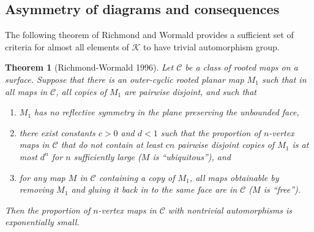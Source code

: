 \documentclass[amsmath,longbibliography,secnumarabic,floatfix,amssymb,nofootinbib,nobibnotes,letterpaper,11pt,notitlepage,tightenlines]{revtex4-1}
\newcommand{\FlatKnotDia}{\mathscr{K}}
\newtheorem{theorem}{Theorem}
\begin{document}
\subsection{Asymmetry of diagrams and consequences}
\label{sec:asymmetry}


The following theorem of Richmond and Wormald \cite{Richmond19951} provides a sufficient set of
criteria for almost all elements of $\FlatKnotDia$ to have trivial automorphism group.
\begin{theorem}[Richmond-Wormald 1996]
  Let $\mathscr C$ be a class of rooted maps on a surface. Suppose that there is an outer-cyclic
  rooted planar map $M_1$ such that in all maps in $\mathscr C$, all copies of $M_1$ are pairwise
  disjoint, and such that
  \begin{enumerate}
  \item $M_1$ has no reflective symmetry in the plane preserving the unbounded face,
  \item there exist constants $c > 0$ and $d < 1$ such that the proportion of $n$-vertex maps in
    $\mathscr C$ that do not contain at least $cn$ pairwise disjoint copies of $M_1$ is at most
    $d^n$ for $n$ sufficiently large ($M$ is ``ubiquitous''), and
  \item for any map $M$ in $\mathscr C$ containing a copy of $M_1$, all maps obtainable by removing
    $M_1$ and gluing it back in to the same face are in $\mathscr C$ ($M$ is ``free'').
  \end{enumerate}
  Then the proportion of $n$-vertex maps in $\mathscr C$ with nontrivial automorphisms is
  exponentially small.
\end{theorem}
\end{document}
